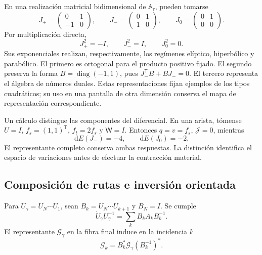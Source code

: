 En una realización matricial bidimensional de
\(\mathbb A_\tau\), pueden tomarse
\[
 J_{+}=\begin{pmatrix}0&1\\-1&0\end{pmatrix},\qquad
 J_{-}=\begin{pmatrix}0&1\\1&0\end{pmatrix},\qquad
 J_{0}=\begin{pmatrix}0&1\\0&0\end{pmatrix}.
\]
Por multiplicación directa,
\[
 J_+^2=-I,\qquad J_-^2=I,\qquad J_0^2=0.
\]
Sus exponenciales realizan, respectivamente, los regímenes elíptico,
hiperbólico y parabólico. El primero es ortogonal para el producto
positivo fijado. El segundo preserva la forma
\(B=\operatorname{diag}(-1,1)\), pues
\(J_-^{\mathsf T}B+BJ_-=0\). El tercero representa el álgebra
de números duales. Estas representaciones fijan ejemplos de los tipos
cuadráticos; su uso en una pantalla de otra dimensión conserva el mapa
de representación correspondiente.

Un cálculo distingue las componentes del diferencial. En una arista,
tómense \(U=I\), \(f_s=(1,1)^{\mathsf T}\),
\(f_t=2f_s\) y \(\mathsf W=I\). Entonces \(q=v=f_s\),
\(\mathcal J=0\), mientras
\begin{equation}
 \mathrm dE(J_-)=-4,\qquad \mathrm dE(J_0)=-2.
 \label{vii:eq:control-regimenes-corriente}
\end{equation}
El representante completo conserva ambas respuestas. La distinción
identifica el espacio de variaciones antes de efectuar la contracción
material.

\subsection{Composición de rutas e inversión orientada}

\begin{proposition}
\label{vii:prop:pullback-invertible}
Para \(U_\gamma=U_N\cdots U_1\), sean
\(B_k=U_N\cdots U_{k+1}\) y \(B_N=I\). Se cumple
\[
 \dot U_\gamma U_\gamma^{-1}
   =\sum_kB_kA_kB_k^{-1}.
\]
El representante \(\mathcal G_\gamma\) en la fibra final induce
en la incidencia \(k\)
\begin{equation}
 \mathcal G_k=B_k^*\mathcal G_\gamma(B_k^{-1})^*.
 \label{vii:eq:transporte-contragrediente}
\end{equation}
\end{proposition}

